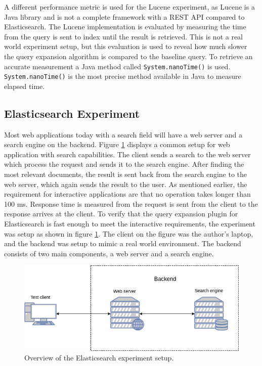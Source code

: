 A different performance metric is used for the Lucene experiment,
as Lucene is a Java library and is not a complete framework with a REST API compared to Elasticsearch.
The Lucene implementation is evaluated by measuring the time from the query is sent to index until the result is retrieved.
This is not a real world experiment setup,
but this evaluation is used to reveal how much slower the query expansion algorithm is compared to the baseline query.
To retrieve an accurate measurement a Java method called \texttt{System.nanoTime()} is used.
\texttt{System.nanoTime()} is the most precise method available in Java to measure elapsed time.

\subsection{Elasticsearch Experiment}
Most web applications today with a search field will have a web server and a search engine on the backend.
Figure \ref{fig:elasticsearch-experiment-setup} displays a common setup for web application with search capabilities.
The client sends a search to the web server which process the request and sends it to the search engine.
After finding the most relevant documents, the result is sent back from the search engine to the web server,
which again sends the result to the user.
As mentioned earlier,
the requirement for interactive applications are that no operation takes longer than 100 ms.
Response time is measured from the request is sent from the client to the response arrives at the client.
To verify that the query expansion plugin for Elasticsearch is fast enough to meet the interactive requirements,
the experiment was setup as shown in figure \ref{fig:elasticsearch-experiment-setup}.
The client on the figure was the author's laptop,
and the backend was setup to mimic a real world environment.
The backend consists of two main components, a web server and a search engine.

\begin{figure}[h!]
  \centering \includegraphics[width=0.9\linewidth]{img/elasticsearch-experiment-setup.png}
  \caption{Overview of the Elasticsearch experiment setup.}
  \label{fig:elasticsearch-experiment-setup}
\end{figure}

